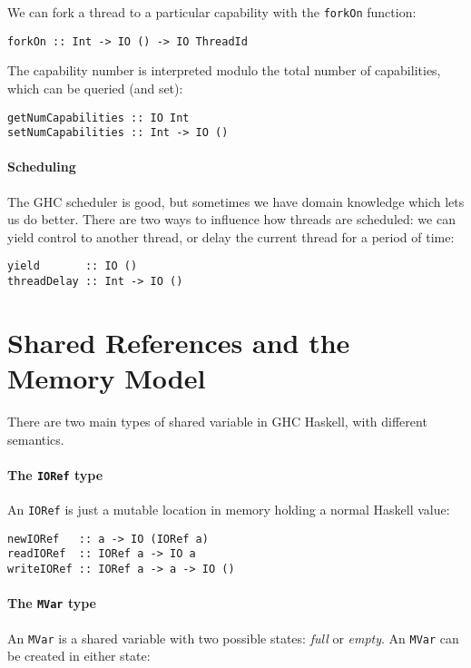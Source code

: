 We can fork a thread to a particular capability with the \verb|forkOn| function:

\begin{verbatim}
forkOn :: Int -> IO () -> IO ThreadId
\end{verbatim}

The capability number is interpreted modulo the total number of capabilities,
which can be queried (and set):

\begin{verbatim}
getNumCapabilities :: IO Int
setNumCapabilities :: Int -> IO ()
\end{verbatim}

\paragraph{Scheduling}
The GHC scheduler is good, but sometimes we have domain knowledge which lets us
do better.  There are two ways to influence how threads are scheduled: we can
yield control to another thread, or delay the current thread for a period of
time:

\begin{verbatim}
yield       :: IO ()
threadDelay :: Int -> IO ()
\end{verbatim}

\section{Shared References and the Memory Model}
\label{sec:concurrent_haskell-mmodel}

There are two main types of shared variable in GHC Haskell, with different
semantics.

\paragraph{The \texttt{IORef} type}
An \verb|IORef| is just a mutable location in memory holding a normal Haskell
value:

\begin{verbatim}
newIORef   :: a -> IO (IORef a)
readIORef  :: IORef a -> IO a
writeIORef :: IORef a -> a -> IO ()
\end{verbatim}

\paragraph{The \texttt{MVar} type}
An \verb|MVar| is a shared variable with two possible states: \emph{full} or
\emph{empty}.  An \verb|MVar| can be created in either state:

